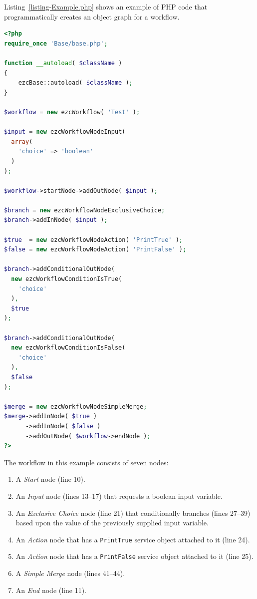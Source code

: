 Listing~\ref{listing-Example.php} shows an example of PHP code that
programmatically creates an object graph for a workflow.

\begin{lstlisting}[language=PHP,float,caption={Creating an object graph using the \emph{Workflow Definition API}},label=listing-Example.php]
<?php
require_once 'Base/base.php';

function __autoload( $className )
{
    ezcBase::autoload( $className );
}

$workflow = new ezcWorkflow( 'Test' );

$input = new ezcWorkflowNodeInput(
  array(
    'choice' => 'boolean'
  )
);

$workflow->startNode->addOutNode( $input );

$branch = new ezcWorkflowNodeExclusiveChoice;
$branch->addInNode( $input );

$true  = new ezcWorkflowNodeAction( 'PrintTrue' );
$false = new ezcWorkflowNodeAction( 'PrintFalse' );

$branch->addConditionalOutNode(
  new ezcWorkflowConditionIsTrue(
    'choice'
  ),
  $true
);

$branch->addConditionalOutNode(
  new ezcWorkflowConditionIsFalse(
    'choice'
  ),
  $false
);

$merge = new ezcWorkflowNodeSimpleMerge;
$merge->addInNode( $true )
      ->addInNode( $false )
      ->addOutNode( $workflow->endNode );
?>
\end{lstlisting}

The workflow in this example consists of seven nodes:

\begin{enumerate}
\item A \emph{Start} node (line 10).
\item An \emph{Input} node (lines 13--17) that requests a boolean input
      variable.
\item An \emph{Exclusive Choice} node (line 21) that conditionally
      branches (lines 27--39) based upon the value of the previously
      supplied input variable.
\item An \emph{Action} node that has a \texttt{PrintTrue} service
      object attached to it (line 24).
\item An \emph{Action} node that has a \texttt{PrintFalse} service
      object attached to it (line 25).
\item A \emph{Simple Merge} node (lines 41--44).
\item An \emph{End} node (line 11).
\end{enumerate}

